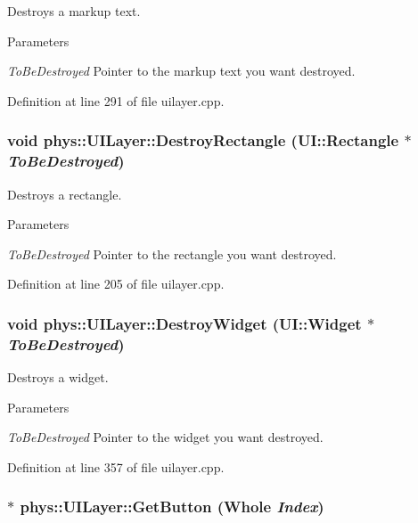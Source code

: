 Destroys a markup text. 


\begin{DoxyParams}{Parameters}
\item[{\em ToBeDestroyed}]Pointer to the markup text you want destroyed. \end{DoxyParams}


Definition at line 291 of file uilayer.cpp.

\hypertarget{classphys_1_1UILayer_a4342bebb6cd81518268beb658668b438}{
\subsubsection[{DestroyRectangle}]{\setlength{\rightskip}{0pt plus 5cm}void phys::UILayer::DestroyRectangle ({\bf UI::Rectangle} $\ast$ {\em ToBeDestroyed})}}
\label{da/d48/classphys_1_1UILayer_a4342bebb6cd81518268beb658668b438}


Destroys a rectangle. 


\begin{DoxyParams}{Parameters}
\item[{\em ToBeDestroyed}]Pointer to the rectangle you want destroyed. \end{DoxyParams}


Definition at line 205 of file uilayer.cpp.

\hypertarget{classphys_1_1UILayer_a5c8d3069ecbc38669251532dc5860e5e}{
\subsubsection[{DestroyWidget}]{\setlength{\rightskip}{0pt plus 5cm}void phys::UILayer::DestroyWidget ({\bf UI::Widget} $\ast$ {\em ToBeDestroyed})}}
\label{da/d48/classphys_1_1UILayer_a5c8d3069ecbc38669251532dc5860e5e}


Destroys a widget. 


\begin{DoxyParams}{Parameters}
\item[{\em ToBeDestroyed}]Pointer to the widget you want destroyed. \end{DoxyParams}


Definition at line 357 of file uilayer.cpp.

\hypertarget{classphys_1_1UILayer_a98acc74c401ba1b28c53f1ea8966b950}{
\subsubsection[{GetButton}]{ $\ast$ phys::UILayer::GetButton ({\bf Whole} {\em Index})}}
\label{da/d48/classphys_1_1UILayer_a98acc74c401ba1b28c53f1ea8966b950}


